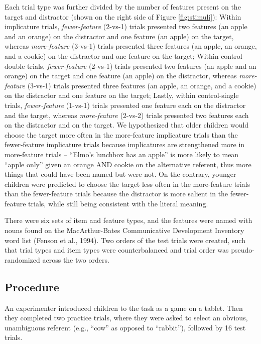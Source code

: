 \documentclass[man]{apa6}
\theoremstyle{definition}
\theoremstyle{definition}
\theoremstyle{definition}
\theoremstyle{remark}
\begin{document}
Each trial type was further divided by the number of features present on
the target and distractor (shown on the right side of Figure
\ref{fig:stimuli}): Within implicature trials, \emph{fewer-feature}
(2-vs-1) trials presented two features (an apple and an orange) on the
distractor and one feature (an apple) on the target, whereas
\emph{more-feature} (3-vs-1) trials presented three features (an apple,
an orange, and a cookie) on the distractor and one feature on the
target; Within control-double trials, \emph{fewer-feature} (2-vs-1)
trials presented two features (an apple and an orange) on the target and
one feature (an apple) on the distractor, whereas \emph{more-feature}
(3-vs-1) trials presented three features (an apple, an orange, and a
cookie) on the distractor and one feature on the target; Lastly, within
control-single trials, \emph{fewer-feature} (1-vs-1) trials presented
one feature each on the distractor and the target, whereas
\emph{more-feature} (2-vs-2) trials presented two features each on the
distractor and on the target. We hypothesized that older children would
choose the target more often in the more-feature implicature trials than
the fewer-feature implicature trials because implicatures are
strengthened more in more-feature trials -- \enquote{Elmo's lunchbox has
an apple} is more likely to mean \enquote{apple only} given an orange
AND cookie on the alternative referent, thus more things that could have
been named but were not. On the contrary, younger children were
predicted to choose the target less often in the more-feature trials
than the fewer-feature trials because the distractor is more salient in
the fewer-feature trials, while still being consistent with the literal
meaning.

There were six sets of item and feature types, and the features were
named with nouns found on the MacArthur-Bates Communicative Development
Inventory word list (Fenson et al., 1994). Two orders of the test trials
were created, such that trial types and item types were counterbalanced
and trial order was pseudo-randomized across the two orders.

\subsection{Procedure}\label{procedure}

An experimenter introduced children to the task as a game on a tablet.
Then they completed two practice trials, where they were asked to select
an obvious, unambiguous referent (e.g., \enquote{cow} as opposed to
\enquote{rabbit}), followed by 16 test trials.
\end{document}
